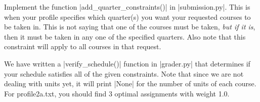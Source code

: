 \item {}
Implement the function |add_quarter_constraints()| in |submission.py|. This is
when your profile specifies which quarter(s) you want your requested courses to
be taken in. This is not saying that one of the courses must be taken,
{\em but if it is}, then it must be taken in any one of the specified quarters.
Also note that this constraint will apply to all courses in that request.

We have written a |verify_schedule()| function in |grader.py| that determines if
your schedule satisfies all of the given constraints. Note that since we are not
dealing with units yet, it will print |None| for the number of units of each
course. For profile2a.txt, you should find 3 optimal assignments with weight 1.0.
